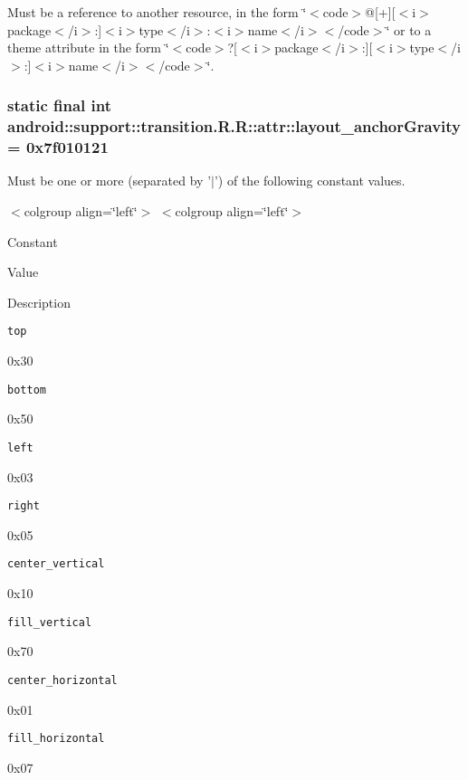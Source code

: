 Must be a reference to another resource, in the form \char`\"{}$<$code$>$@\mbox{[}+\mbox{]}\mbox{[}$<$i$>$package$<$/i$>$:\mbox{]}$<$i$>$type$<$/i$>$:$<$i$>$name$<$/i$>$$<$/code$>$\char`\"{} or to a theme attribute in the form \char`\"{}$<$code$>$?\mbox{[}$<$i$>$package$<$/i$>$:\mbox{]}\mbox{[}$<$i$>$type$<$/i$>$:\mbox{]}$<$i$>$name$<$/i$>$$<$/code$>$\char`\"{}. \hypertarget{classandroid_1_1support_1_1transition_1_1_r_1_1attr_deb09abe8bca82a431b8d725efdf2e2a}{
\subsubsection[{layout\_\-anchorGravity}]{\setlength{\rightskip}{0pt plus 5cm}static final int android::support::transition.R.R::attr::layout\_\-anchorGravity = 0x7f010121}}
\label{classandroid_1_1support_1_1transition_1_1_r_1_1attr_deb09abe8bca82a431b8d725efdf2e2a}


Must be one or more (separated by '$|$') of the following constant values. \begin{TabularC}{0}
\hline
\end{TabularC}
$<$colgroup align=\char`\"{}left\char`\"{}$>$ $<$colgroup align=\char`\"{}left\char`\"{}$>$ 

Constant

Value

Description 

{\tt top}

0x30

{\tt bottom}

0x50

{\tt left}

0x03

{\tt right}

0x05

{\tt center\_\-vertical}

0x10

{\tt fill\_\-vertical}

0x70

{\tt center\_\-horizontal}

0x01

{\tt fill\_\-horizontal}

0x07

